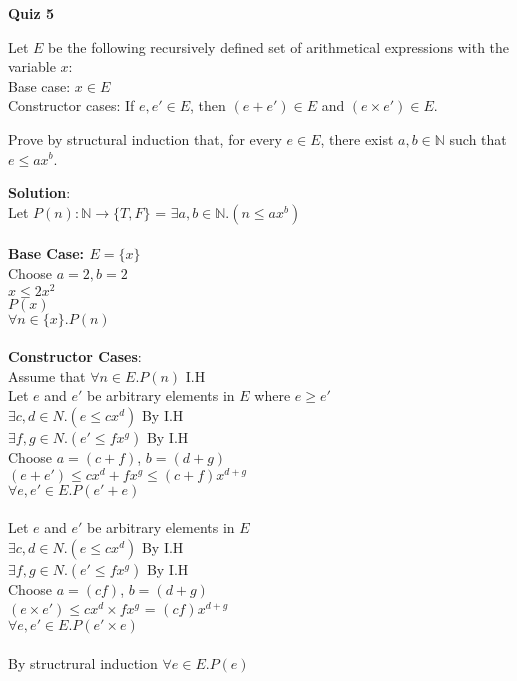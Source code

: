 \documentclass[11pt]{article}
\def\nats{{\mathbb N}}
\begin{document}
{\bf \large Quiz 5}

\begin{question}
Let $E$ be the following recursively defined set of arithmetical
expressions with the variable $x$:\\
Base case: $x \in  E$\\
Constructor cases: If $e,e' \in E$, then $(e + e') \in E$ and $(e \times e') \in E$.

Prove by structural induction that, for every $e \in E$,
there exist $a, b \in \nats$ such that
$e \leq a x^b$.
\end{question}

\begin{solution}
{\bf Solution}:\\
Let $P(n): \nats\rightarrow\{T,F\}$ = $\exists a,b\in\nats.(n\le ax^b)$  \\\\
{\bf Base Case: $E=\{x\}$}\\
\null\quad Choose $a=2,b=2$\\
\null\quad $x\le 2x^2$\\
\null\quad $P(x)$\\
$\forall n\in\{x\}.P(n)$\\\\
{\bf Constructor Cases}: \\
\null\quad Assume that $\forall n\in E.P(n)$ I.H\\
\null\qquad Let $e$ and $e'$ be arbitrary elements in $E$ where $e \ge e'$\\
\null\qquad $\exists c,d\in N.(e\le cx^d)$ By I.H\\
\null\qquad $\exists f,g\in N.(e'\le fx^g)$ By I.H\\
\null\qquad Choose $a = (c+ f)$, $b = (d+g)$\\
\null\qquad $(e+e') \le cx^d + fx^g \le (c+f)x^{d+g}$\\
\null\quad $\forall e,e'\in E.P(e' + e)$\\\\
\null\qquad Let $e$ and $e'$ be arbitrary elements in $E$\\
\null\qquad $\exists c,d\in N.(e\le cx^d)$ By I.H\\
\null\qquad $\exists f,g\in N.(e'\le fx^g)$ By I.H\\
\null\qquad Choose $a = (cf)$, $b = (d+g)$\\
\null\qquad $(e\times e') \le cx^d \times fx^g$ = $(cf)x^{d+g}$\\
\null\quad $\forall e,e'\in E.P(e' \times e)$\\\\
By structrural induction $\forall e\in E.P(e)$
\end{solution}
\end{document}
